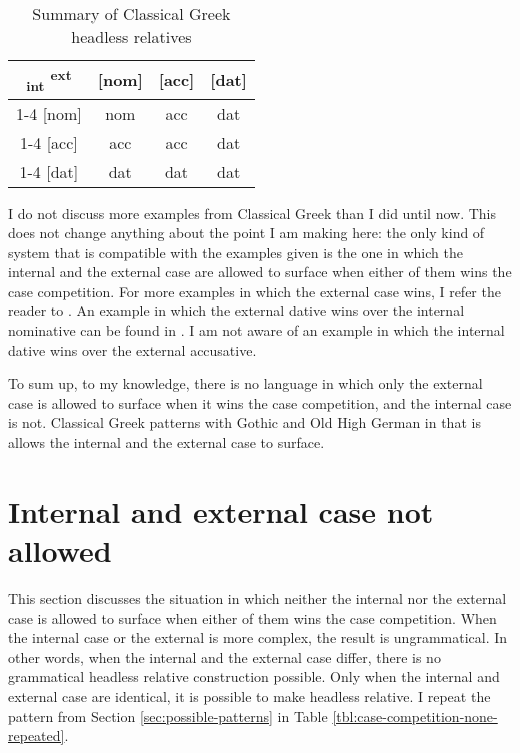 \begin{table}[H]
  \center
  \caption{Summary of Classical Greek headless relatives}
  \begin{tabular}{c|c|c|c}
    \toprule
    \textsubscript{\ac{int}} \textsuperscript{\ac{ext}}
           & [\ac{nom}]
           & [\ac{acc}]
           & [\ac{dat}]
           \\ \cmidrule{1-4}
       [\ac{nom}]
           & \ac{nom}
           & \ac{acc}
           & \ac{dat}
           \\ \cmidrule{1-4}
       [\ac{acc}]
           & \cellcolor{LG}\ac{acc}
           & \ac{acc}
           & \cellcolor{DG}\ac{dat}
           \\ \cmidrule{1-4}
       [\ac{dat}]
           & \ac{dat}
           & \ac{dat}
           & \ac{dat}
           \\
     \bottomrule
  \end{tabular}
    \label{tbl:case-competition-classical-greek}
\end{table}

I do not discuss more examples from Classical Greek than I did until now. This does not change anything about the point I am making here: the only kind of system that is compatible with the examples given is the one in which the internal and the external case are allowed to surface when either of them wins the case competition. For more examples in which the external case wins, I refer the reader to . An example in which the external dative wins over the internal nominative can be found in \citet{noussia2015}. I am not aware of an example in which the internal dative wins over the external accusative.

To sum up, to my knowledge, there is no language in which only the external case is allowed to surface when it wins the case competition, and the internal case is not. Classical Greek patterns with Gothic and Old High German in that is allows the internal and the external case to surface.



\section{Internal and external case not allowed}\label{sec:pattern-iv}

This section discusses the situation in which neither the internal nor the external case is allowed to surface when either of them wins the case competition. When the internal case or the external is more complex, the result is ungrammatical. In other words, when the internal and the external case differ, there is no grammatical headless relative construction possible. Only when the internal and external case are identical, it is possible to make headless relative. I repeat the pattern from Section \ref{sec:possible-patterns} in Table \ref{tbl:case-competition-none-repeated}.

